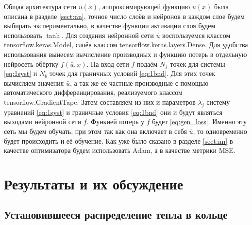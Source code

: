 \documentclass[a4paper,14pt]{extarticle} %
\begin{document}
Общая архитектура сети $\bar{u}(x)$, аппроксимирующей функцию $u(x)$ была описана в разделе \ref{sect:nn}, точное число слоёв и нейронов в каждом слое будем выбирать экспериментально, в качестве функции активации слоя будем использовать $\tanh$. Для создания нейронной сети $\bar{u}$ воспользуемся классом tensorflow.keras.Model, слоёв классом tensorflow.keras.layers.Dense. Для удобства использования вынесем вычисление производных и функцию потерь в отдельную нейросеть-обёртку $f(\bar{u}, x)$. На вход сети $f$ подаём $N_f$ точек для системы \eqref{eq:1syst} и $N_b$ точек для граничных условий \eqref{eq:1bnd}. Для этих точек вычисляем значения $\bar{u}$, а так же её частные производные с помощью автоматического дифференцирования, реализуемого классом tensorflow.GradientTape. Затем составляем из них и параметров $\lambda_j$ систему уравнений \eqref{eq:1syst} и граничные условия \eqref{eq:1bnd} они и будут являться выходами нейронной сети $f$. Функией потерь у $f$ будет \eqref{eq:gen_loss}. Именно эту сеть мы будем обучать, при этом так как она включает в себя $\bar{u}$, то одновременно будет происходить и её обучение. Как уже было сказано в разделе \ref{sect:nn} в качестве оптимизатора будем использовать Adam, а в качестве метрики MSE.





\FloatBarrier
\section{Результаты и их обсуждение}

\subsection{Установившееся распределение тепла в кольце}
\end{document}
